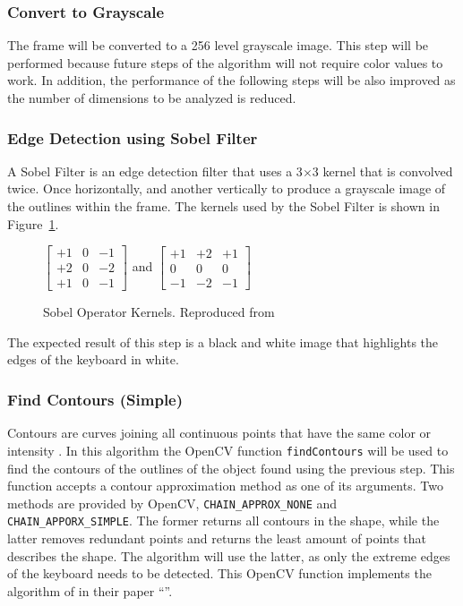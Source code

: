 \documentclass{report}
\begin{document}
\subsubsection{Convert to Grayscale}
The frame will be converted to a 256 level grayscale image. This step will be
performed because future steps of the algorithm will not require color values to
work. In addition, the performance of the following steps will be also improved
as the number of dimensions to be analyzed is reduced.

\subsubsection{Edge Detection using Sobel Filter}
A Sobel Filter is an edge detection filter that uses a 3$\times$3 kernel that is
convolved twice. Once horizontally, and another vertically to produce a
grayscale image of the outlines within the frame. The kernels used by the Sobel
Filter \parencite{sobel2014} is shown in Figure~\ref{fig:metho-algo-key-sobel}.

\begin{figure}[H]
	\centering
  $\begin{bmatrix}
  +1 & 0 & -1\\
  +2 & 0 & -2\\
  +1 & 0 & -1
  \end{bmatrix}$
	and
  $\begin{bmatrix}
  +1 & +2 & +1\\
  0 & 0 & 0\\
  -1 & -2 & -1
  \end{bmatrix}$
	\caption{Sobel Operator Kernels. Reproduced from }
	\label{fig:metho-algo-key-sobel}
\end{figure}

The expected result of this step is a black and white image that highlights the
edges of the keyboard in white.

\subsubsection{Find Contours (Simple)}
\label{section:metho-algo-key-contours}
Contours are curves joining all continuous points that have the same color or
intensity \parencite{opencv-contours}. In this algorithm the OpenCV function
\texttt{findContours} will be used to find the contours of the outlines of the
object found using the previous step. This function accepts a contour
approximation method as one of its arguments. Two methods are provided by
OpenCV, \texttt{CHAIN\_APPROX\_NONE} and \texttt{CHAIN\_APPORX\_SIMPLE}. The
former returns all contours in the shape, while the latter removes redundant
points and returns the least amount of points that describes the shape. The
algorithm will use the latter, as only the extreme edges of the keyboard needs
to be detected. This OpenCV function implements the algorithm of
\cite{contours} in their paper ``''.
\end{document}
